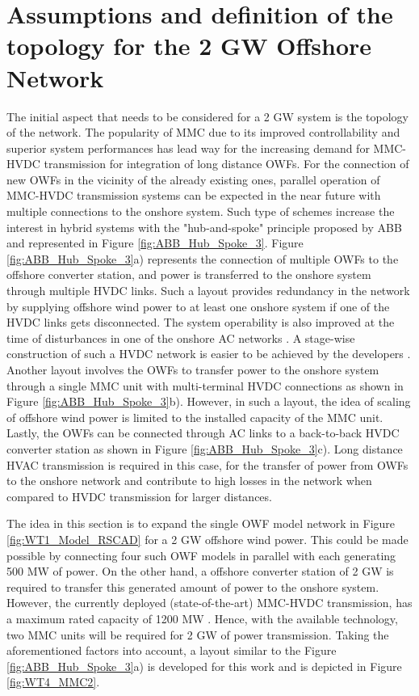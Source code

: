 \section{Assumptions and definition of the topology for the 2 GW Offshore Network}
The initial aspect that needs to be considered for a 2 GW system is the topology of the network. The popularity of \gls{MMC} due to its improved controllability and superior system performances has lead way for the increasing demand for \gls{MMC}-\gls{HVDC} transmission for integration of long distance \gls{OWF}s. For the connection of new \gls{OWF}s in the vicinity of the already existing ones, parallel operation of \gls{MMC}-\gls{HVDC} transmission systems can be expected in the near future with multiple connections to the onshore system. Such type of schemes increase the interest in hybrid systems with the "hub-and-spoke" principle proposed by ABB \cite{abb_hvdc_2018} and represented in Figure \ref{fig:ABB_Hub_Spoke_3}. Figure \ref{fig:ABB_Hub_Spoke_3}a) represents the connection of multiple \gls{OWF}s to the offshore converter station, and power is transferred to the onshore system through multiple \gls{HVDC} links. Such a layout provides redundancy in the network by supplying offshore wind power to at least one onshore system if one of the \gls{HVDC} links gets disconnected. The system operability is also improved at the time of disturbances in one of the onshore \gls{AC} networks \cite{lescale2012parallelling}. A stage-wise construction of such a \gls{HVDC} network is easier to be achieved by the developers \cite{irnawan2019planning}. Another layout involves the \gls{OWF}s to transfer power to the onshore system through a single \gls{MMC} unit with multi-terminal \gls{HVDC} connections as shown in Figure \ref{fig:ABB_Hub_Spoke_3}b). However, in such a layout, the idea of scaling of offshore wind power is limited to the installed capacity of the \gls{MMC} unit. Lastly, the \gls{OWF}s can be connected through \gls{AC} links to a back-to-back \gls{HVDC} converter station as shown in Figure \ref{fig:ABB_Hub_Spoke_3}c). Long distance \gls{HVAC} transmission is required in this case, for the transfer of power from \gls{OWF}s to the onshore network and contribute to high losses in the network when compared to \gls{HVDC} transmission for larger distances.

The idea in this section is to expand the single \gls{OWF} model network in Figure \ref{fig:WT1_Model_RSCAD} for a 2 GW offshore wind power. This could be made possible by connecting four such \gls{OWF} models in parallel with each generating 500 MW of power. On the other hand, a offshore converter station of 2 GW is required to transfer this generated amount of power to the onshore system. However, the currently deployed (state-of-the-art) \gls{MMC}-\gls{HVDC} transmission, has a maximum rated capacity of 1200 MW \cite{cigre2005b4}. Hence, with the available technology, two \gls{MMC} units will be required for 2 GW of power transmission. Taking the aforementioned factors into account, a layout similar to the Figure \ref{fig:ABB_Hub_Spoke_3}a) is developed for this work and is depicted in Figure \ref{fig:WT4_MMC2}. 

